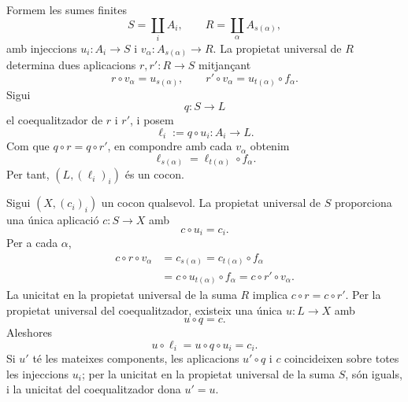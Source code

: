 \begin{prova}
Formem les sumes finites
\[
S=\coprod_i A_i,
\qquad
R=\coprod_\alpha A_{s(\alpha)},
\]
amb injeccions \(u_i:A_i\to S\) i \(v_\alpha:A_{s(\alpha)}\to R\). La propietat universal de \(R\) determina dues aplicacions \(r,r':R\to S\) mitjançant
\[
r\circ v_\alpha=u_{s(\alpha)},
\qquad
r'\circ v_\alpha=u_{t(\alpha)}\circ f_\alpha.
\]
Sigui
\[
q:S\to L
\]
el coequalitzador de \(r\) i \(r'\), i posem
\[
\ell_i:=q\circ u_i:A_i\to L.
\]
Com que \(q\circ r=q\circ r'\), en compondre amb cada \(v_\alpha\) obtenim
\[
\ell_{s(\alpha)}=\ell_{t(\alpha)}\circ f_\alpha.
\]
Per tant, \((L,(\ell_i)_i)\) és un cocon.

Sigui \((X,(c_i)_i)\) un cocon qualsevol. La propietat universal de \(S\) proporciona una única aplicació \(c:S\to X\) amb
\[
c\circ u_i=c_i.
\]
Per a cada \(\alpha\),
\[
\begin{aligned}
c\circ r\circ v_\alpha
&=c_{s(\alpha)}
=c_{t(\alpha)}\circ f_\alpha\\
&=c\circ u_{t(\alpha)}\circ f_\alpha
=c\circ r'\circ v_\alpha.
\end{aligned}
\]
La unicitat en la propietat universal de la suma \(R\) implica \(c\circ r=c\circ r'\). Per la propietat universal del coequalitzador, existeix una única \(u:L\to X\) amb
\[
u\circ q=c.
\]
Aleshores
\[
u\circ\ell_i=u\circ q\circ u_i=c_i.
\]
Si \(u'\) té les mateixes components, les aplicacions \(u'\circ q\) i \(c\) coincideixen sobre totes les injeccions \(u_i\); per la unicitat en la propietat universal de la suma \(S\), són iguals, i la unicitat del coequalitzador dona \(u'=u\).
\end{prova}

